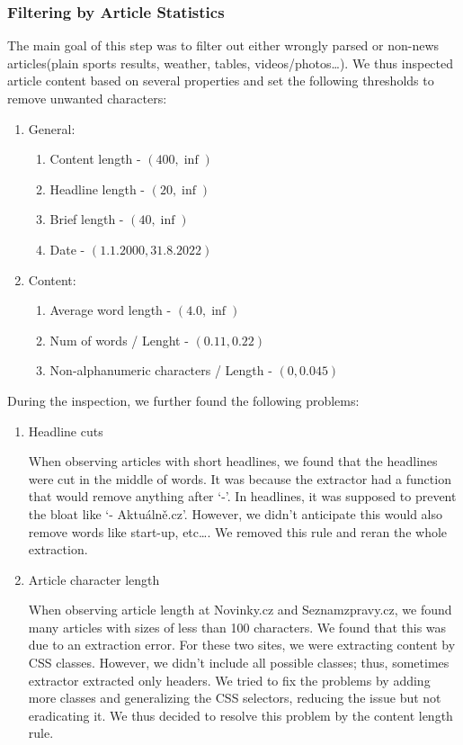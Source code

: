 \begin{itemize}
\subsubsection{Filtering by Article Statistics}
The main goal of this step was to filter out either wrongly parsed
or non-news articles(plain sports results, weather, tables, videos/photos\dots).
We thus inspected article content based on several properties
and set the following thresholds to remove unwanted characters:
\begin{enumerate}
    \item General:
    \begin{enumerate}
        \item Content length - $(400, \inf)$
        \item Headline length - $(20, \inf)$
        \item Brief length - $(40, \inf)$
        \item Date - $(1.1.2000, 31.8.2022)$
    \end{enumerate}
    \item Content:
    \begin{enumerate}
        \item Average word length - $(4.0, \inf)$
        \item Num of words / Lenght - $(0.11, 0.22)$
        \item Non-alphanumeric characters / Length - $(0, 0.045)$
    \end{enumerate}
\end{enumerate}

During the inspection, we further found the following problems:
\begin{enumerate}
    \item Headline cuts

        When observing articles with short headlines, we found that the headlines 
        were cut in the middle of words.
        It was because the extractor had a function that would remove anything after `-'. 
        In headlines, it was supposed to prevent the bloat like `- Aktuálně.cz'. However,
        we didn't anticipate this would also remove words like start-up, etc\dots.
        We removed this rule and reran the whole extraction.
    \item Article character length

        When observing article length at Novinky.cz and Seznamzpravy.cz,
        we found many articles with sizes of less than 100 characters.
        We found that this was due to an extraction error. 
        For these two sites, we were extracting content by CSS classes.
        However, we didn't include all possible classes;
        thus, sometimes extractor extracted only headers. 
        We tried to fix the problems by adding more classes and generalizing the CSS selectors,
        reducing the issue but not eradicating it. We thus decided to resolve this problem
        by the content length rule.


\end{enumerate}
\end{itemize}
